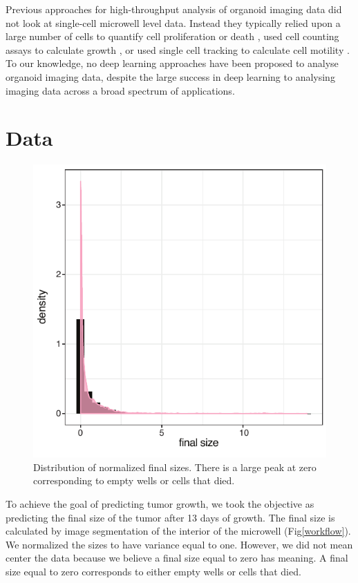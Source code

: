 \documentclass[10pt,twocolumn,letterpaper]{article}
\begin{document}
Previous approaches for high-throughput analysis of organoid imaging data did not look at single-cell microwell level data.  Instead they typically relied upon a large number of cells to quantify cell proliferation or death \cite{jabs2017screening},  used cell counting assays to calculate growth \cite{sebrell2018live}, or used single cell tracking to calculate cell motility \cite{geum2016epidermal}.  To our knowledge, no deep learning approaches have been proposed to analyse organoid imaging data, despite the large success in deep learning to analysing imaging data across a broad spectrum of applications.

\section{Data}
\begin{figure}[b!]
\begin{center}
 \includegraphics[width=0.8\linewidth]{figures/final_day_hyst2_area_density.pdf}
\end{center}
   \caption{Distribution of normalized final sizes.  There is a large peak at zero corresponding to empty wells or cells that died.}
\label{final_size_dist}
\end{figure}

To achieve the goal of predicting tumor growth, we took the objective as predicting the final size of the tumor after 13 days of growth.  The final size is calculated by image segmentation of the interior of the microwell (Fig\ref{workflow}).  We normalized the sizes to have variance equal to one.  However, we did not mean center the data because we believe a final size equal to zero has meaning.  A final size equal to zero corresponds to either empty wells or cells that died.  
\end{document}
